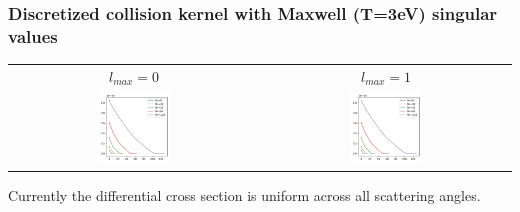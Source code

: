 \documentclass[mathserif, aspectratio=169]{beamer}
\begin{document}
\begin{frame}
\frametitle{Discretized collision kernel with Maxwell (T=3eV) singular values}
\begin{table}
	\centering
	\begin{tabular}{cc}
		$l_{max}=0$ &  $l_{max}=1$ \\
		\includegraphics[width=0.3\textwidth]{figures/m_spectrum_3ev_l_max_0.png} & 
		\includegraphics[width=0.3\textwidth]{figures/m_spectrum_3ev_l_max_1.png} 
	\end{tabular}
\end{table}
Currently the differential cross section is uniform across all scattering angles. 
\end{frame}
\end{document}
